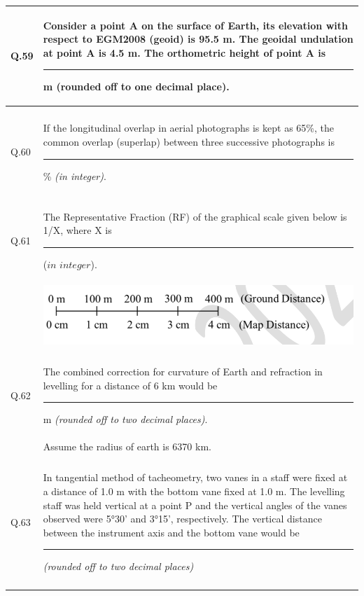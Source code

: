\documentclass[12pt]{article}
\begin{document}
\begin{table}[H]
\renewcommand{\arraystretch}{3}
\setlength{\tabcolsep}{8pt}
\begin{tabular}{|l|p{15cm}|}
\hline
 
Q.59& Consider a point A on the surface of Earth, its elevation with respect to EGM2008
(geoid) is 95.5 m. The geoidal undulation at point A is 4.5 m. The orthometric height
of point A is \rule{2cm}{0.15mm} m (rounded off to one decimal place).\\ \hline 
 & \\ \hline
Q.60&If the longitudinal overlap in aerial photographs is kept as 65\%, the common overlap
(superlap) between three successive photographs is \rule{2cm}{0.15mm}\% \textit{(in integer)}.\\ \hline
& \\ \hline
Q.61&The Representative Fraction (RF) of the graphical scale given below is 1/X, where X is \rule{2cm}{0.15mm}($in$ $integer$).\\ \hline
&\includegraphics[scale=0.6]{LatexImage7.png}\\ \hline
 & \\ \hline
Q.62 &The combined correction for curvature of Earth and refraction in levelling for a
distance of 6 km would be \rule{2cm}{0.15mm}m \textit{(rounded off to two decimal places)}.\\ 
 & Assume the radius of earth is 6370 km. \\ \hline
 & \\ \hline
Q.63&In tangential method of tacheometry, two vanes in a staff were fixed at a distance
of 1.0 m with the bottom vane fixed at 1.0 m. The levelling staff was held vertical
at a point P and the vertical angles of the vanes observed were 5°30' and 3°15',
respectively. The vertical distance between the instrument axis and the bottom vane
would be \rule{2cm}{0.15mm} \textit{(rounded off to two decimal places)} \\ \hline
& \\ \hline


\end{tabular}
\end{table}
\end{document}
